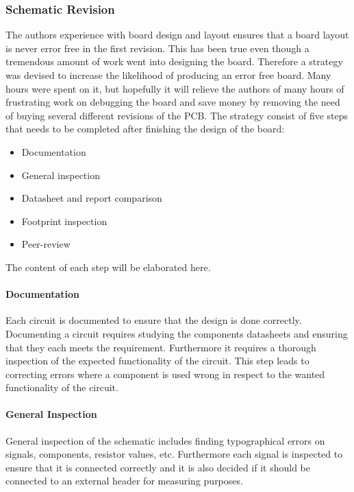 \subsubsection{Schematic Revision} %
\label{ssub:schematic_revision}

The authors experience with board design and layout ensures that a board layout is never error free in the first revision. 
This has been true even though a tremendous amount of work went into designing the board.
Therefore a strategy was devised to increase the likelihood of producing an error free board.
Many hours were spent on it, but hopefully it will relieve the authors of many hours of frustrating work on debugging the board and save money by removing the need of buying several different revisions of the PCB. 
The strategy consist of five steps that needs to be completed after finishing the design of the board:

\begin{itemize}
	\item Documentation
	\item General inspection
	\item Datasheet and report comparison
	\item Footprint inspection 
	\item Peer-review
\end{itemize}

The content of each step will be elaborated here. 

\paragraph{Documentation}
Each circuit is documented to ensure that the design is done correctly.
Documenting a circuit requires studying the components datasheets and ensuring that they each meets the requirement.
Furthermore it requires a thorough inspection of the expected functionality of the circuit.
This step leads to correcting errors where a component is used wrong in respect to the wanted functionality of the circuit.

\paragraph{General Inspection}
General inspection of the schematic includes finding typographical errors on signals, components, resistor values, etc.
Furthermore each signal is inspected to ensure that it is connected correctly and it is also decided if it should be connected to an external header for measuring purposes.

